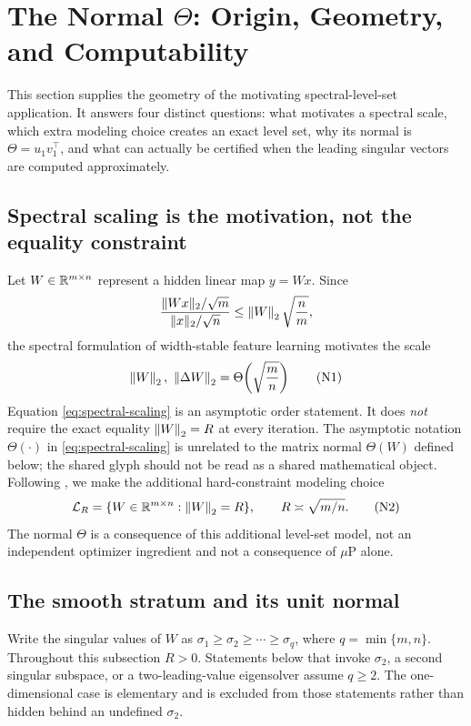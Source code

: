 \section{The Normal \texorpdfstring{\(\Theta\)}{Theta}: Origin, Geometry, and Computability}
\label{sec:normal-theta}

This section supplies the geometry of the motivating spectral-level-set
application.  It answers four distinct questions: what motivates a spectral
scale, which extra modeling choice creates an exact level set, why its normal is
\(\Theta=u_1v_1^\top\), and what can actually be certified when the leading
singular vectors are computed approximately.

\subsection{Spectral scaling is the motivation, not the equality constraint}

Let \(W\in\mathbb{R}^{m\times n}\) represent a hidden linear map \(y=Wx\).  Since
\[
 \frac{\|Wx\|_2/\sqrt m}{\|x\|_2/\sqrt n}
 \le \left\lVert W\right\rVert_{2}\sqrt{\frac nm},
\]
the spectral formulation of width-stable feature learning motivates the scale
\citep{yang2023spectral}
\[
 \left\lVert W\right\rVert_{2},\ \left\lVert \Delta W\right\rVert_{2}
 =\Theta\!\left(\sqrt{\frac mn}\right)
\tag{N1}
\label{eq:spectral-scaling}
\]
Equation \eqref{eq:spectral-scaling} is an asymptotic order statement.  It does
\emph{not} require the exact equality \(\left\lVert W\right\rVert_{2}=R\) at every iteration.
The asymptotic notation \(\Theta(\cdot)\) in
\eqref{eq:spectral-scaling} is unrelated to the matrix normal
\(\Theta(W)\) defined below; the shared glyph should not be read as a shared
mathematical object.
Following \citet{xie2026controlled}, we make the additional hard-constraint
modeling choice
\[
 \mathcal L_R
 =
 \{W\in\mathbb{R}^{m\times n}:\left\lVert W\right\rVert_{2}=R\},
 \qquad
 R\asymp\sqrt{m/n}.
\tag{N2}
\label{eq:spectral-level-set}
\]
The normal \(\Theta\) is a consequence of this additional level-set model, not
an independent optimizer ingredient and not a consequence of \(\mu\)P alone.

\subsection{The smooth stratum and its unit normal}

Write the singular values of \(W\) as
\(\sigma_1\ge\sigma_2\ge\cdots\ge\sigma_q\), where
\(q=\min\{m,n\}\).  Throughout this subsection \(R>0\).
Statements below that invoke \(\sigma_2\), a second singular subspace, or a
two-leading-value eigensolver assume \(q\ge2\).  The one-dimensional case is
elementary and is excluded from those statements rather than hidden behind an
undefined \(\sigma_2\).

